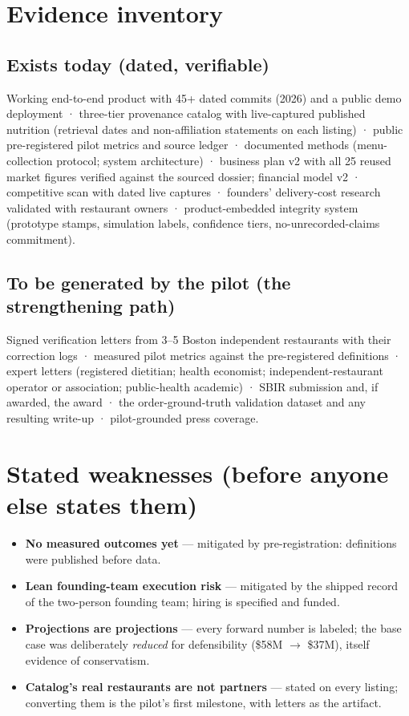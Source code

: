 \documentclass[10pt]{article}
\begin{document}
\section{Evidence inventory}

\subsection*{Exists today (dated, verifiable)}
Working end-to-end product with 45+ dated commits (2026) and a public demo deployment · three-tier provenance catalog
with live-captured published nutrition (retrieval dates and non-affiliation statements on each listing) · public
pre-registered pilot metrics and source ledger · documented methods (menu-collection protocol; system architecture)
· business plan v2 with all 25 reused market figures verified against the sourced dossier; financial model v2 ·
competitive scan with dated live captures · founders' delivery-cost research validated with restaurant owners ·
product-embedded integrity system (prototype stamps, simulation labels, confidence tiers, no-unrecorded-claims
commitment).

\subsection*{To be generated by the pilot (the strengthening path)}
Signed verification letters from 3--5 Boston independent restaurants with their correction logs · measured pilot
metrics against the pre-registered definitions · expert letters (registered dietitian; health economist;
independent-restaurant operator or association; public-health academic) · SBIR submission and, if awarded, the award
· the order-ground-truth validation dataset and any resulting write-up · pilot-grounded press coverage.

\section{Stated weaknesses (before anyone else states them)}

\begin{itemize}[leftmargin=1.3em,itemsep=2pt]
\item \textbf{No measured outcomes yet} --- mitigated by pre-registration: definitions were published before data.
\item \textbf{Lean founding-team execution risk} --- mitigated by the shipped record of the two-person founding team; hiring is specified and funded.
\item \textbf{Projections are projections} --- every forward number is labeled; the base case was deliberately
\emph{reduced} for defensibility (\$58M $\to$ \$37M), itself evidence of conservatism.
\item \textbf{Catalog's real restaurants are not partners} --- stated on every listing; converting them is the
pilot's first milestone, with letters as the artifact.
\end{itemize}
\end{document}
